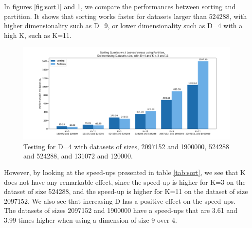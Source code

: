 In figures \ref{fig:sort1} and \ref{fig:sort2}, we compare the performances between sorting and partition. It shows that sorting works faster for datasets larger than 524288, with higher dimensionality such as D=9, or lower dimensionality such as D=4 with a high K, such as K=11. 

\begin{figure}[H]
\centering
\includegraphics[width=1\textwidth]{pics/plot-figs/new-sort-alld4.png}
\caption{Testing for D=4 with datasets of sizes‚ 2097152 and 1900000, 524288 and 524288, and 131072 and 120000.}
\label{fig:sort2}
\end{figure}





However, by looking at the speed-ups presented in table \ref{tab:sort}, we see that K does not have any remarkable effect, since the speed-up is higher for K=3 on the dataset of size 524288, and the speed-up is higher for K=11 on the dataset of size 2097152. We also see that increasing D has a positive effect on the speed-ups. The datasets of sizes 2097152 and 1900000 have a speed-ups that are 3.61 and 3.99 times higher when using a dimension of size 9 over 4. 

